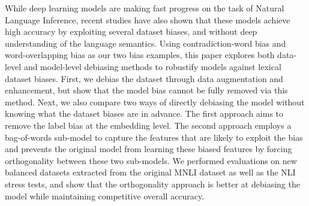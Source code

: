 While deep learning models are making fast progress on the task of Natural Language Inference, recent studies have also shown that these models achieve high accuracy by exploiting several dataset biases, and without deep understanding of the language semantics. Using contradiction-word bias and word-overlapping bias as our two bias examples, this paper explores both data-level and model-level debiasing methods to robustify models against lexical dataset biases. First, we debias the dataset through data augmentation and enhancement, but show that the model bias cannot be fully removed via this method. Next, we also compare two ways of directly debiasing the model without knowing what the dataset biases are in advance. The first approach aims to remove the label bias at the embedding level. The second approach employs a bag-of-words sub-model to capture the features that are likely to exploit the bias and prevents the original model from learning these biased features by forcing orthogonality between these two sub-models. We performed evaluations on new balanced datasets extracted from the original MNLI dataset as well as the NLI stress tests, and show that the orthogonality approach is better at debiasing the model while maintaining competitive overall accuracy.
